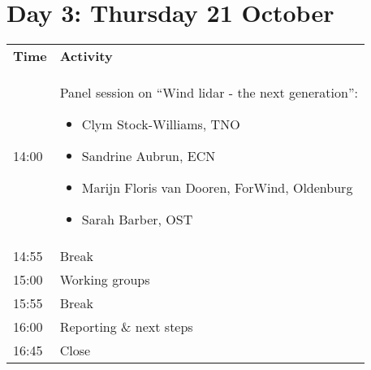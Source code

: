 \section{Day 3: Thursday 21 October}

\begin{table}[!h]
    \centering
    \begin{tabular}{@{}
        |p{}
        |p{}
        |@{}}
    \rowcolor{Task32Blue2} \textbf{Time} & \textbf{Activity} \\  
    14:00 & Panel session on “Wind lidar - the next generation”:
        \begin{itemize}
            \item Clym Stock-Williams, TNO
            \item Sandrine Aubrun, ECN
            \item Marijn Floris van Dooren, ForWind, Oldenburg
            \item Sarah Barber, OST
        \end{itemize} \\
    14:55 & Break \\
    15:00 & Working groups \\
    15:55 & Break \\
    16:00 & Reporting \& next steps \\
    16:45 & Close
    \end{tabular}
    \label{tab:day2-agenda}
\end{table}
